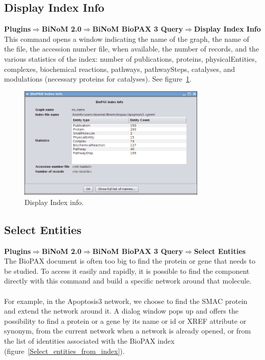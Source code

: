 \subsection{Display Index Info}
\textbf{Plugins$\Rightarrow$BiNoM 2.0$\Rightarrow$BiNoM BioPAX 3 Query$\Rightarrow$Display Index Info}\\

This command opens a window indicating the name of the graph, the name of the
file, the accession number file, when available, the number of records, and the
various statistics of the index: number of publications, proteins,
physicalEntities, complexes, biochemical reactions, pathways, pathwaySteps,
catalyses, and modulations (necessary proteins for catalyses). See
figure~\ref{BioPAX_Index_Info}.

\begin{figure}[h]
\centering
\includegraphics[width=0.8\textwidth]{graphics/ebo_biopax_index_info}
\caption{Display Index info.}
\label{BioPAX_Index_Info}
\end{figure}

\subsection{Select Entities}
\textbf{Plugins$\Rightarrow$BiNoM 2.0$\Rightarrow$BiNoM BioPAX 3 Query$\Rightarrow$Select Entities}\\

The BioPAX document is often too big to find the protein or gene that needs to
be studied. To access it easily and rapidly, it is possible to find the
component directly with this command and build a specific network around that
molecule.\\\\
For example, in the Apoptosis3 network, we choose to find the SMAC protein and extend the
network around it. A dialog window pops up and offers the possibility to
find a protein or a gene by its name or id or XREF attribute or synonym, from
the current network when a network is already opened, or from the list of
identities associated with the BioPAX index
(figure~\ref{Select_entities_from_index}).\\\\

